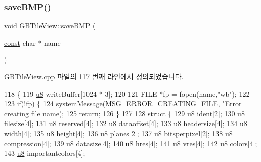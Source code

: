 \subsubsection{\texorpdfstring{save\+B\+M\+P()}{saveBMP()}}
{\footnotesize\ttfamily void G\+B\+Tile\+View\+::save\+B\+MP (\begin{DoxyParamCaption}\item[{\mbox{\hyperlink{getopt1_8c_a2c212835823e3c54a8ab6d95c652660e}{const}} char $\ast$}]{name }\end{DoxyParamCaption})}



G\+B\+Tile\+View.\+cpp 파일의 117 번째 라인에서 정의되었습니다.


\begin{DoxyCode}
118 \{
119   \mbox{\hyperlink{_system_8h_aed742c436da53c1080638ce6ef7d13de}{u8}} writeBuffer[1024 * 3];
120   
121   FILE *fp = fopen(name,\textcolor{stringliteral}{"wb"});
122 
123   \textcolor{keywordflow}{if}(!fp) \{
124     \mbox{\hyperlink{system_8cpp_a747a9cb8e015a3d45cca636b5bd0fc69}{systemMessage}}(\mbox{\hyperlink{_n_l_s_8h_a165f1f2539e202f0a24e6e9583c63475}{MSG\_ERROR\_CREATING\_FILE}}, \textcolor{stringliteral}{"Error creating file %
      name);
125     \textcolor{keywordflow}{return};
126   \}
127 
128   \textcolor{keyword}{struct }\{
129     \mbox{\hyperlink{_system_8h_aed742c436da53c1080638ce6ef7d13de}{u8}} ident[2];
130     \mbox{\hyperlink{_system_8h_aed742c436da53c1080638ce6ef7d13de}{u8}} filesize[4];
131     \mbox{\hyperlink{_system_8h_aed742c436da53c1080638ce6ef7d13de}{u8}} reserved[4];
132     \mbox{\hyperlink{_system_8h_aed742c436da53c1080638ce6ef7d13de}{u8}} dataoffset[4];
133     \mbox{\hyperlink{_system_8h_aed742c436da53c1080638ce6ef7d13de}{u8}} headersize[4];
134     \mbox{\hyperlink{_system_8h_aed742c436da53c1080638ce6ef7d13de}{u8}} width[4];
135     \mbox{\hyperlink{_system_8h_aed742c436da53c1080638ce6ef7d13de}{u8}} height[4];
136     \mbox{\hyperlink{_system_8h_aed742c436da53c1080638ce6ef7d13de}{u8}} planes[2];
137     \mbox{\hyperlink{_system_8h_aed742c436da53c1080638ce6ef7d13de}{u8}} bitsperpixel[2];
138     \mbox{\hyperlink{_system_8h_aed742c436da53c1080638ce6ef7d13de}{u8}} compression[4];
139     \mbox{\hyperlink{_system_8h_aed742c436da53c1080638ce6ef7d13de}{u8}} datasize[4];
140     \mbox{\hyperlink{_system_8h_aed742c436da53c1080638ce6ef7d13de}{u8}} hres[4];
141     \mbox{\hyperlink{_system_8h_aed742c436da53c1080638ce6ef7d13de}{u8}} vres[4];
142     \mbox{\hyperlink{_system_8h_aed742c436da53c1080638ce6ef7d13de}{u8}} colors[4];
143     \mbox{\hyperlink{_system_8h_aed742c436da53c1080638ce6ef7d13de}{u8}} importantcolors[4];
}
\end{DoxyCode}
